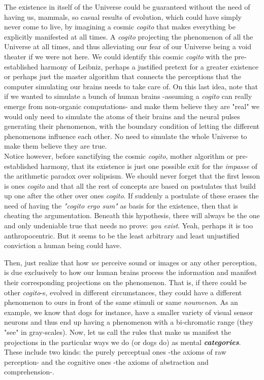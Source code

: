 \documentclass[11pt, a4paper]{article} %
\DeclareRobustCommand{\mybox}[2][gray!10]{%
\begin{tcolorbox}[   %
        left=0.2cm,
        right=0.2cm,
        top=0.15cm,
        bottom=0.15cm,
        colback=#1,
        colframe=#1,
        width=\dimexpr\textwidth\relax, 
        enlarge left by=0mm,
        boxsep=5pt,
        arc=0pt,outer arc=0pt,
        ]
        #2
\end{tcolorbox}
}
\begin{document}
\mybox{ The existence in itself of the Universe could be guaranteed without the need of having us, mammals, so casual results of evolution, which could have simply never come to live, by imagining a cosmic {\em cogito} that makes everything be explicitly manifested at all times. A {\em cogito} projecting the phenomenon of all the Universe at all times, and thus alleviating our fear of our Universe being a void theater if we were not here. We could identify this cosmic {\em cogito} with the pre-established harmony of Leibniz, perhaps a justified pretext for a greater existence or perhaps just the master algorithm that connects the perceptions that the computer simulating our brains needs to take care of. On this last idea, note that if we wanted to simulate a bunch of human brains -assuming a {\em cogito} can really emerge from non-organic computations- and make them believe they are "real" we would only need to simulate the atoms of their brains and the neural pulses generating their phenomenon, with the boundary condition of letting the different phenomenons influence each other. No need to simulate the whole Universe to make them believe they are true. \vspace{-0.2cm} \\

Notice however, before sanctifying the cosmic {\em cogito}, mother algorithm or pre-established harmony, that its existence is just one possible exit for the {\em impasse} of the arithmetic paradox over solipsism. We should never forget that the first lesson is ones {\em cogito} and that all the rest of concepts are based on postulates that build up one after the other over ones {\em cogito}. If suddenly a postulate of these erases the need of having the {\em "cogito ergo sum"} as basis for the existence, then that is cheating the argumentation. Beneath this hypothesis, there will always be the one and only undeniable true that needs no prove: {\em you exist}. Yeah, perhaps it is too anthropocentric. But it seems to be the least arbitrary and least unjustified conviction a human being could have.
}

Then, just realize that how {\em we} perceive sound or images or any other perception, is due exclusively to how our human brains process the information and manifest their corresponding projections on the phenomenon. That is, if there could be other {\em cogito}-s, evolved in different circumstances, they could have a different phenomenon to ours in front of the same stimuli or same {\em noumenon}. As an example, we know that dogs for instance, have a smaller variety of visual sensor neurons and thus end up having a phenomenon with a bi-chromatic range (they "see" in gray-scales). Now, let us call the rules that make us manifest the projections in the particular ways we do (or dogs do) as mental {\em \bf categories}. These include two kinds: the purely perceptual ones -the axioms of raw perception- and the cognitive ones -the axioms of abstraction and comprehension-. 
\end{document}
